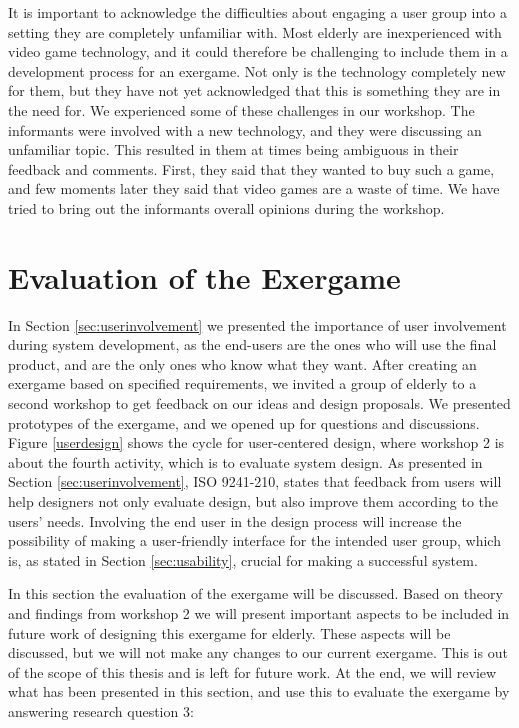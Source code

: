 It is important to acknowledge the difficulties about engaging a user group into a setting they are completely unfamiliar with. Most elderly are inexperienced with video game technology, and it could therefore be challenging to include them in a development process for an exergame. Not only is the technology completely new for them, but they have not yet acknowledged that this is something they are in the need for. We experienced some of these challenges in our workshop. The informants were involved with a new technology, and they were discussing an unfamiliar topic. This resulted in them at times being ambiguous in their feedback and comments. First, they said that they wanted to buy such a game, and few moments later they said that video games are a waste of time. We have tried to bring out the informants overall opinions during the workshop. 


\section{Evaluation of the Exergame}
\label{sec:discfindings2}
In Section \ref{sec:userinvolvement} we presented the importance of user involvement during system development, as the end-users are the ones who will use the final product, and are the only ones who know what they want. After creating an exergame based on specified requirements, we invited a group of elderly to a second workshop to get feedback on our ideas and design proposals. We presented prototypes of the exergame, and we opened up for questions and discussions. Figure \ref{userdesign} shows the cycle for user-centered design, where workshop 2 is about the fourth activity, which is to evaluate system design. As presented in Section \ref{sec:userinvolvement}, ISO 9241-210, states that feedback from users will help designers not only evaluate design, but also improve them according to the users' needs. Involving the end user in the design process will increase the possibility of making a user-friendly interface for the intended user group, which is, as stated in Section \ref{sec:usability}, crucial for making a successful system. 

In this section the evaluation of the exergame will be discussed. Based on theory and findings from workshop 2 we will present important aspects to be included in future work of designing this exergame for elderly. These aspects will be discussed, but we will not make any changes to our current exergame. This is out of the scope of this thesis and is left for future work. At the end, we will review what has been presented in this section, and use this to evaluate the exergame by answering research question 3:

